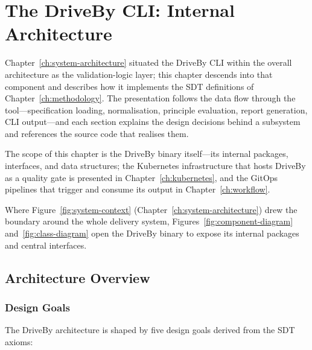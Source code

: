 \chapter{The DriveBy CLI: Internal Architecture}
\label{ch:architecture}

Chapter~\ref{ch:system-architecture} situated the DriveBy CLI within the overall architecture as the validation-logic layer; this chapter descends into that component and describes how it implements the SDT definitions of Chapter~\ref{ch:methodology}. The presentation follows the data flow through the tool---specification loading, normalisation, principle evaluation, report generation, CLI output---and each section explains the design decisions behind a subsystem and references the source code that realises them.

The scope of this chapter is the DriveBy binary itself---its internal packages, interfaces, and data structures; the Kubernetes infrastructure that hosts DriveBy as a quality gate is presented in Chapter~\ref{ch:kubernetes}, and the GitOps pipelines that trigger and consume its output in Chapter~\ref{ch:workflow}.

Where Figure~\ref{fig:system-context} (Chapter~\ref{ch:system-architecture}) drew the boundary around the whole delivery system, Figures~\ref{fig:component-diagram} and~\ref{fig:class-diagram} open the DriveBy binary to expose its internal packages and central interfaces.

\section{Architecture Overview}
\label{sec:arch-overview}

\subsection{Design Goals}
\label{subsec:design-goals}

The DriveBy architecture is shaped by five design goals derived from the SDT axioms:

